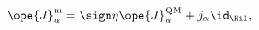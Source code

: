 \begin{equation}	\label{4.13}
\ope{J}_\alpha^{\mathrm{m}}
= \sign \eta \ope{J}_\alpha^{\mathrm{QM}} + j_\alpha\id_\Hil,
	\end{equation}


